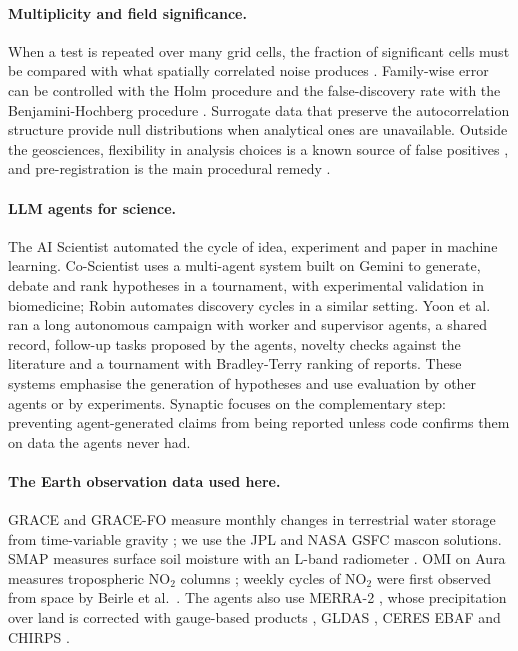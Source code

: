 \documentclass[11pt,a4paper]{article}
\begin{document}
\paragraph{Multiplicity and field significance.} When a test is repeated over many grid cells, the fraction of
significant cells must be compared with what spatially correlated noise produces \citep{livezey1983,wilks2016}.
Family-wise error can be controlled with the Holm procedure \citep{holm1979} and the false-discovery rate with the
Benjamini-Hochberg procedure \citep{benjamini1995}. Surrogate data that preserve the autocorrelation structure
\citep{theiler1992} provide null distributions when analytical ones are unavailable. Outside the geosciences,
flexibility in analysis choices is a known source of false positives \citep{simmons2011,ioannidis2005}, and
pre-registration is the main procedural remedy \citep{nosek2018}.

\paragraph{LLM agents for science.} The AI Scientist \citep{lu2024} automated the cycle of idea, experiment and paper
in machine learning. Co-Scientist \citep{gottweis2026} uses a multi-agent system built on Gemini to generate, debate and
rank hypotheses in a tournament, with experimental validation in biomedicine; Robin \citep{ghareeb2026} automates
discovery cycles in a similar setting. Yoon et al.\ \citep{yoon2026} ran a long autonomous campaign with worker and
supervisor agents, a shared record, follow-up tasks proposed by the agents, novelty checks against the literature and a
tournament with Bradley-Terry ranking of reports. These systems emphasise the generation of hypotheses and use
evaluation by other agents or by experiments. Synaptic focuses on the complementary step: preventing agent-generated
claims from being reported unless code confirms them on data the agents never had.

\paragraph{The Earth observation data used here.} GRACE and GRACE-FO measure monthly changes in terrestrial water
storage from time-variable gravity \citep{tapley2004,landerer2020}; we use the JPL \citep{watkins2015} and NASA GSFC
\citep{loomis2019} mascon solutions. SMAP measures surface soil moisture with an L-band radiometer \citep{entekhabi2010}.
OMI on Aura measures tropospheric NO$_2$ columns \citep{levelt2006}; weekly cycles of NO$_2$ were first observed from
space by Beirle et al.\ \citep{beirle2003}. The agents also use MERRA-2 \citep{gelaro2017}, whose precipitation over
land is corrected with gauge-based products \citep{reichle2017}, GLDAS \citep{rodell2004}, CERES EBAF \citep{loeb2018}
and CHIRPS \citep{funk2015}.
\end{document}
